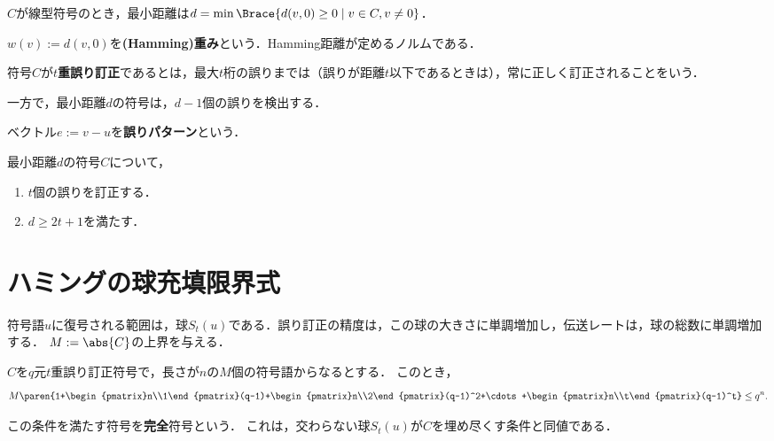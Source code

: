 \documentclass[uplatex,dvipdfmx]{jsreport}
\begin{document}
\begin{lemma}
    $C$が線型符号のとき，最小距離は$d=\min\Brace{d(v,0)\ge 0\mid v\in C,v\ne0}$．
\end{lemma}
\begin{remarks}
    $w(v):=d(v,0)$を\textbf{(Hamming)重み}という．Hamming距離が定めるノルムである．
\end{remarks}

\begin{definition}
    符号$C$が\textbf{$t$重誤り訂正}であるとは，最大$t$桁の誤りまでは（誤りが距離$t$以下であるときは），常に正しく訂正されることをいう．
\end{definition}
\begin{remark}
    一方で，最小距離$d$の符号は，$d-1$個の誤りを検出する．
\end{remark}

\begin{definition}
    ベクトル$e:=v-u$を\textbf{誤りパターン}という．
\end{definition}

\begin{theorem}
    最小距離$d$の符号$C$について，
    \begin{enumerate}
        \item $t$個の誤りを訂正する．
        \item $d\ge 2t+1$を満たす．
    \end{enumerate}
\end{theorem}

\section{ハミングの球充填限界式}

\begin{tcolorbox}[colframe=ForestGreen, colback=ForestGreen!10!white,breakable,colbacktitle=ForestGreen!40!white,coltitle=black,fonttitle=\bfseries\sffamily,
title=]
    符号語$u$に復号される範囲は，球$S_t(u)$である．誤り訂正の精度は，この球の大きさに単調増加し，伝送レートは，球の総数に単調増加する．
    $M:=\abs{C}$の上界を与える．
\end{tcolorbox}

\begin{theorem}
    $C$を$q$元$t$重誤り訂正符号で，長さが$n$の$M$個の符号語からなるとする．
    このとき，
    \[M\paren{1+\begin{pmatrix}n\\1\end{pmatrix}(q-1)+\begin{pmatrix}n\\2\end{pmatrix}(q-1)^2+\cdots+\begin{pmatrix}n\\t\end{pmatrix}(q-1)^t}\le q^n.\]
\end{theorem}
\begin{remarks}
    この条件を満たす符号を\textbf{完全}符号という．
    これは，交わらない球$S_t(u)$が$C$を埋め尽くす条件と同値である．
\end{remarks}
\end{document}
